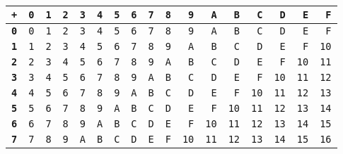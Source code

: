 \begin{tabular}{rrrrrrrrrrrrrrrrr}
\toprule
\textbf{\texttt{+}}& \textbf{\texttt{0}}& \textbf{\texttt{1}}& \textbf{\texttt{2}}& \textbf{\texttt{3}}& \textbf{\texttt{4}}& \textbf{\texttt{5}}& \textbf{\texttt{6}}& \textbf{\texttt{7}}& \textbf{\texttt{8}}& \textbf{\texttt{9}}& \textbf{\texttt{A}}& \textbf{\texttt{B}}& \textbf{\texttt{C}}& \textbf{\texttt{D}}& \textbf{\texttt{E}}& \textbf{\texttt{F}}\\ \midrule
\textbf{\texttt{0}} & \texttt{0} & \texttt{1} & \texttt{2} & \texttt{3} & \texttt{4} & \texttt{5} & \texttt{6} & \texttt{7} & \texttt{8} & \texttt{9} & \texttt{A} & \texttt{B} & \texttt{C} & \texttt{D} & \texttt{E} & \texttt{F}\\
\textbf{\texttt{1}} & \texttt{1} & \texttt{2} & \texttt{3} & \texttt{4} & \texttt{5} & \texttt{6} & \texttt{7} & \texttt{8} & \texttt{9} & \texttt{A} & \texttt{B} & \texttt{C} & \texttt{D} & \texttt{E} & \texttt{F} & \texttt{10}\\
\textbf{\texttt{2}} & \texttt{2} & \texttt{3} & \texttt{4} & \texttt{5} & \texttt{6} & \texttt{7} & \texttt{8} & \texttt{9} & \texttt{A} & \texttt{B} & \texttt{C} & \texttt{D} & \texttt{E} & \texttt{F} & \texttt{10} & \texttt{11}\\
\textbf{\texttt{3}} & \texttt{3} & \texttt{4} & \texttt{5} & \texttt{6} & \texttt{7} & \texttt{8} & \texttt{9} & \texttt{A} & \texttt{B} & \texttt{C} & \texttt{D} & \texttt{E} & \texttt{F} & \texttt{10} & \texttt{11} & \texttt{12}\\
\textbf{\texttt{4}} & \texttt{4} & \texttt{5} & \texttt{6} & \texttt{7} & \texttt{8} & \texttt{9} & \texttt{A} & \texttt{B} & \texttt{C} & \texttt{D} & \texttt{E} & \texttt{F} & \texttt{10} & \texttt{11} & \texttt{12} & \texttt{13}\\
\textbf{\texttt{5}} & \texttt{5} & \texttt{6} & \texttt{7} & \texttt{8} & \texttt{9} & \texttt{A} & \texttt{B} & \texttt{C} & \texttt{D} & \texttt{E} & \texttt{F} & \texttt{10} & \texttt{11} & \texttt{12} & \texttt{13} & \texttt{14}\\
\textbf{\texttt{6}} & \texttt{6} & \texttt{7} & \texttt{8} & \texttt{9} & \texttt{A} & \texttt{B} & \texttt{C} & \texttt{D} & \texttt{E} & \texttt{F} & \texttt{10} & \texttt{11} & \texttt{12} & \texttt{13} & \texttt{14} & \texttt{15}\\
\textbf{\texttt{7}} & \texttt{7} & \texttt{8} & \texttt{9} & \texttt{A} & \texttt{B} & \texttt{C} & \texttt{D} & \texttt{E} & \texttt{F} & \texttt{10} & \texttt{11} & \texttt{12} & \texttt{13} & \texttt{14} & \texttt{15} & \texttt{16}\\

\end{tabular}
